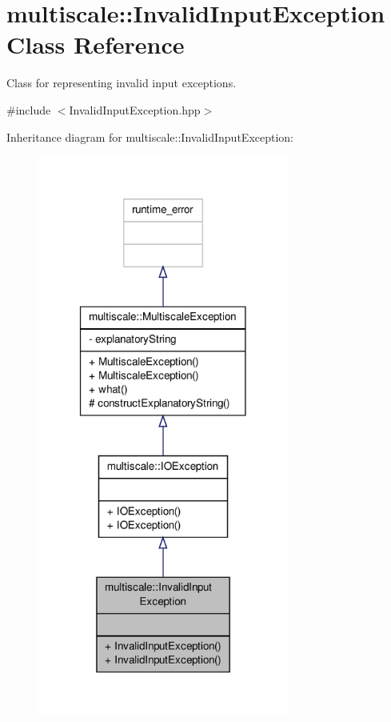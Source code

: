 \hypertarget{classmultiscale_1_1InvalidInputException}{\section{multiscale\-:\-:Invalid\-Input\-Exception Class Reference}
\label{classmultiscale_1_1InvalidInputException}
}


Class for representing invalid input exceptions.  




{\ttfamily \#include $<$Invalid\-Input\-Exception.\-hpp$>$}



Inheritance diagram for multiscale\-:\-:Invalid\-Input\-Exception\-:\nopagebreak
\begin{figure}[H]
\begin{center}
\leavevmode
\includegraphics[width=234pt]{classmultiscale_1_1InvalidInputException__inherit__graph}
\end{center}
\end{figure}


